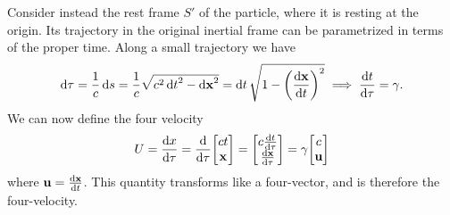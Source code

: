 Consider instead the rest frame $S'$ of the particle, where it is resting at the origin. Its trajectory in the original inertial frame can be parametrized in terms of the proper time. Along a small trajectory we have
\begin{align*}
	\dd{\tau} = \frac{1}{c}\dd{s} = \frac{1}{c}\sqrt{c^{2}\dd{t}^{2} - \dd{\vb{x}}^{2}} = \dd{t}\sqrt{1 - \left(\dv{\vb{x}}{t}\right)^{2}} \implies \dv{t}{\tau} = \gamma.
\end{align*}
We can now define the four velocity
\begin{align*}
	U = \dv{x}{\tau} = \dv{\tau}
	\mqty[
		ct \\
		\vb{x}
	]
	=
	\mqty[
		c\dv{t}{\tau} \\
		\dv{\vb{x}}{\tau}
	]
	= \gamma
	\mqty[
		c \\
		\vb{u}
	]
\end{align*}
where $\vb{u} = \dv{\vb{x}}{t}$. This quantity transforms like a four-vector, and is therefore the four-velocity.